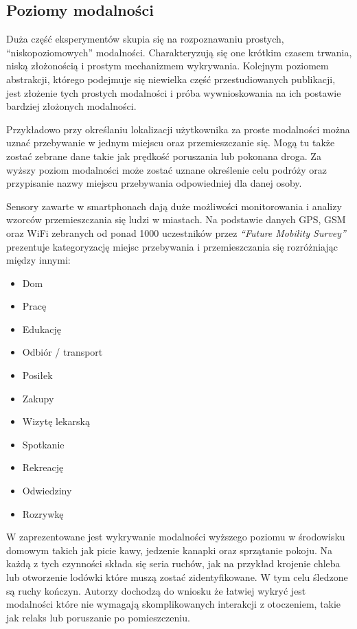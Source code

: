 \subsection{Poziomy modalności}
\label{sec:modality_levels}
Duża część eksperymentów skupia się na rozpoznawaniu prostych, ``niskopoziomowych'' modalności. Charakteryzują się one krótkim czasem trwania, niską złożonością i prostym mechanizmem wykrywania. Kolejnym poziomem abstrakcji, którego podejmuje się niewielka część przestudiowanych publikacji, jest złożenie tych prostych modalności i próba wywnioskowania na ich postawie bardziej złożonych modalności.

Przykładowo przy określaniu lokalizacji użytkownika za proste modalności można uznać przebywanie w jednym miejscu oraz przemieszczanie się. Mogą tu także zostać zebrane dane takie jak prędkość poruszania lub pokonana droga. Za wyższy poziom modalności może zostać uznane określenie celu podróży oraz przypisanie  nazwy miejscu przebywania odpowiedniej dla danej osoby.

Sensory zawarte w smartphonach dają duże możliwości monitorowania i analizy wzorców przemieszczania się ludzi w miastach. Na podstawie danych GPS, GSM oraz WiFi zebranych od ponad 1000 uczestników przez \textit{``Future Mobility Survey''} \cite{26_Mobility_Sensing} prezentuje kategoryzację miejsc przebywania i przemieszczania się rozróżniając między innymi:
\begin{itemize}
    \item Dom
    \item Pracę
    \item Edukację
    \item Odbiór / transport
    \item Posiłek
    \item Zakupy
    \item Wizytę lekarską
    \item Spotkanie
    \item Rekreację
    \item Odwiedziny
    \item Rozrywkę
\end{itemize}

W \cite{38_High_Lvl_HAR} zaprezentowane jest wykrywanie modalności wyższego poziomu w środowisku domowym takich jak picie kawy, jedzenie kanapki oraz sprzątanie pokoju. Na każdą z tych czynności składa się seria ruchów, jak na przykład krojenie chleba lub otworzenie lodówki które muszą zostać zidentyfikowane. W tym celu śledzone są ruchy kończyn. Autorzy dochodzą do wniosku że łatwiej wykryć jest modalności które nie wymagają skomplikowanych interakcji z otoczeniem, takie jak relaks lub poruszanie po pomieszczeniu.

